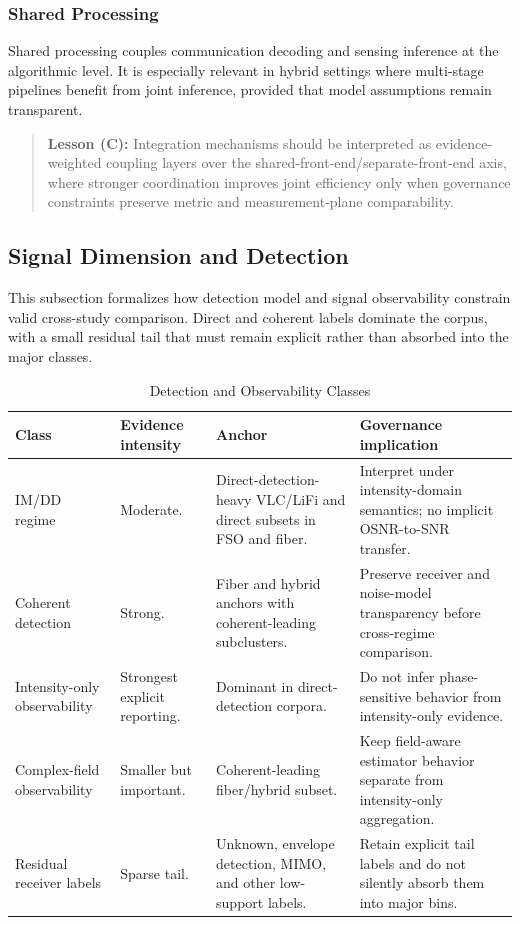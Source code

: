 \subsubsection{Shared Processing}
Shared processing couples communication decoding and sensing inference at the algorithmic level. It is especially relevant in hybrid settings where multi-stage pipelines benefit from joint inference, provided that model assumptions remain transparent.

\begin{quote}
\textbf{Lesson (C):} Integration mechanisms should be interpreted as evidence-weighted coupling layers over the shared-front-end/separate-front-end axis, where stronger coordination improves joint efficiency only when governance constraints preserve metric and measurement-plane comparability.
\end{quote}

\subsection{Signal Dimension and Detection}
This subsection formalizes how detection model and signal observability constrain valid cross-study comparison. Direct and coherent labels dominate the corpus, with a small residual tail that must remain explicit rather than absorbed into the major classes.

\begin{table}[!t]
\caption{Detection and Observability Classes}
\label{tab:detection-classes}
\centering
\footnotesize
\setlength{\tabcolsep}{4pt}
\begin{tabularx}{\textwidth}{p{}p{}p{}X}
\toprule
\textbf{Class} & \textbf{Evidence intensity} & \textbf{Anchor} & \textbf{Governance implication} \\
\midrule
IM/DD regime & Moderate. & Direct-detection-heavy VLC/LiFi and direct subsets in FSO and fiber. & Interpret under intensity-domain semantics; no implicit OSNR-to-SNR transfer. \\
Coherent detection & Strong. & Fiber and hybrid anchors with coherent-leading subclusters. & Preserve receiver and noise-model transparency before cross-regime comparison. \\
Intensity-only observability & Strongest explicit reporting. & Dominant in direct-detection corpora. & Do not infer phase-sensitive behavior from intensity-only evidence. \\
Complex-field observability & Smaller but important. & Coherent-leading fiber/hybrid subset. & Keep field-aware estimator behavior separate from intensity-only aggregation. \\
Residual receiver labels & Sparse tail. & Unknown, envelope detection, MIMO, and other low-support labels. & Retain explicit tail labels and do not silently absorb them into major bins. \\
\bottomrule
\end{tabularx}
\end{table}

